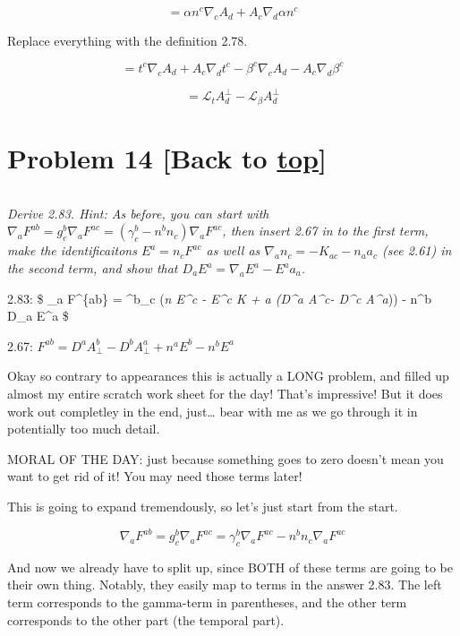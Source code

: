 \documentclass[landscape,letterpaper,10pt,english]{article}
\begin{document}
\[ =  \alpha n^c \nabla_c A_d + A_c \nabla_d \alpha n^c \]

Replace everything with the definition 2.78.

\[ =  t^c \nabla_c A_d + A_c \nabla_d t^c - \beta^c \nabla_c A_d - A_c \nabla_d \beta^c \]

\[ = \mathcal{L}_t A^\perp_d - \mathcal{L}_\beta A^\perp_d \]

    \hypertarget{problem-14-back-to-top}{%
\section{\texorpdfstring{Problem 14 {[}Back to
\hyperref[toc]{top}{]}}{Problem 14 {[}Back to {]}}}\label{problem-14-back-to-top}}

\[\label{P14}\]

\emph{Derive 2.83. Hint: As before, you can start with
\(\nabla_a F^{ab} = g^b_c \nabla_a F^{ac} = (\gamma^b_c - n^bn_c)\nabla_a F^{ac}\),
then insert 2.67 in to the first term, make the identificaitons
\(E^a = n_c F^{ac}\) as well as \(\nabla_a n_c = -K_{ac} -n_aa_c\) (see
2.61) in the second term, and show that
\(D_aE^a = \nabla_a E^a - E^aa_a\).}

2.83: \$ \nabla\_a F\^{}\{ab\} = \gamma\^{}b\_c (\emph{n
E\^{}c - E\^{}c K + \nabla\emph{a (D\^{}a A\^{}c}\perp - D\^{}c
A\^{}a}\perp)) - n\^{}b D\_a E\^{}a \$

    2.67: \(F^{ab} = D^a A^b_\perp - D^b A^a_\perp + n^aE^b - n^bE^a\)

    Okay so contrary to appearances this is actually a LONG problem, and
filled up almost my entire scratch work sheet for the day! That's
impressive! But it does work out completley in the end, just\ldots{}
bear with me as we go through it in potentially too much detail.

MORAL OF THE DAY: just because something goes to zero doesn't mean you
want to get rid of it! You may need those terms later!

This is going to expand tremendously, so let's just start from the
start.

\[\nabla_a F^{ab} = g^b_c \nabla_a F^{ac} = \gamma^b_c \nabla_a F^{ac} - n^bn_c\nabla_aF^{ac}\]

And now we already have to split up, since BOTH of these terms are going
to be their own thing. Notably, they easily map to terms in the answer
2.83. The left term corresponds to the gamma-term in parentheses, and
the other term corresponds to the other part (the temporal part).
\end{document}
